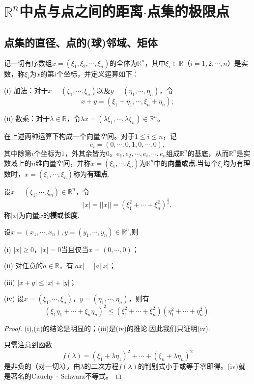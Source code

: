 \documentclass[../../main.tex]{subfiles}%
\begin{document}
\section{$\mathbb{R}^n$中点与点之间的距离$\cdot$点集的极限点}

\subsection{点集的直径、点的(球)邻域、矩体}

\begin{definition}\label{definition:Rn与Rn中的运算}
  记一切有序数组\(x = (\xi_1,\xi_2,\cdots,\xi_n)\)的全体为\(\mathbb{R}^n\)，其中\(\xi_i\in\mathbb{R}\)（\(i = 1,2,\cdots,n\)）是实数，称\(\xi_i\)为\(x\)的第\(i\)个坐标，并定义运算如下：

(i) 加法：对于\(x = (\xi_1,\cdots,\xi_n)\)以及\(y = (\eta_1,\cdots,\eta_n)\)，令
\[x + y = (\xi_1+\eta_1,\cdots,\xi_n+\eta_n);\]

(ii) 数乘：对于\(\lambda\in\mathbb{R}\)，令\(\lambda x = (\lambda\xi_1,\cdots,\lambda\xi_n)\in\mathbb{R}^n\)。

在上述两种运算下构成一个向量空间。对于\(1\leqslant i\leqslant n\)，记
\[e_i = (0,\cdots,0,1,0,\cdots,0),\]
其中除第\(i\)个坐标为\(1\)，外其余皆为\(0\)。\(e_1,e_2,\cdots,e_i,\cdots,e_n\)组成\(\mathbb{R}^n\)的基底，从而\(\mathbb{R}^n\)是实数域上的\(n\)维向量空间，并称\(x = (\xi_1,\cdots,\xi_n)\)为\(\mathbb{R}^n\)中的\textbf{向量}或\textbf{点}.当每个\(\xi_i\)均为有理数时，\(x = (\xi_1,\cdots,\xi_n)\)称为\textbf{有理点}.
\end{definition}

\begin{definition}
设\(x = (\xi_1,\cdots,\xi_n)\in\mathbb{R}^n\)，令
\[|x|=||x|| = (\xi_1^2+\cdots+\xi_n^2)^{\frac{1}{2}},\]
称\(|x|\)为向量\(x\)的\textbf{模}或\textbf{长度}.
\end{definition}

\begin{proposition}[向量的模的性质]\label{proposition:向量的模的性质}
设\(x=(x_1,\cdots ,x_n),y=\left( y_1,\cdots ,y_n \right) \in \mathbb{R} ^n\),则

(i) \(|x|\geqslant0\)，\(|x| = 0\)当且仅当\(x=(0,\cdots,0)\)；

(ii) 对任意的\(a\in\mathbb{R}\)，有\(|ax| = |a||x|\)；

(iii) \(|x + y|\leqslant|x|+|y|\)；

(iv) 设\(x = (\xi_1,\cdots,\xi_n)\)，\(y = (\eta_1,\cdots,\eta_n)\)，则有
\[(\xi_1\eta_1+\cdots+\xi_n\eta_n)^2\leqslant(\xi_1^2+\cdots+\xi_n^2)(\eta_1^2+\cdots+\eta_n^2).\]
\end{proposition}
\begin{proof}
  (i),(ii)的结论是明显的；(iii)是(iv)的推论.因此我们只证明(iv).

只需注意到函数
\[f(\lambda)=(\xi_1+\lambda\eta_1)^2+\cdots+(\xi_n+\lambda\eta_n)^2\]
是非负的（对一切\(\lambda\)），由\(\lambda\)的二次方程\(f(\lambda)\)的判别式小于或等于零即得。(iv)就是著名的Cauchy - Schwarz不等式。
\end{proof}
\end{document}
